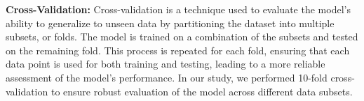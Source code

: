 \documentclass[conference]{IEEEtran}
\begin{document}
\vspace{.2em}
\textbf{Cross-Validation:}  
Cross-validation is a technique used to evaluate the model’s ability to generalize to unseen data by partitioning the dataset into multiple subsets, or folds. The model is trained on a combination of the subsets and tested on the remaining fold. This process is repeated for each fold, ensuring that each data point is used for both training and testing, leading to a more reliable assessment of the model's performance. In our study, we performed 10-fold cross-validation to ensure robust evaluation of the model across different data subsets.


\begin{table}[h]
\centering
\renewcommand{\arraystretch}{1.4}
\vspace{.6em}
\caption{10-Fold Cross-Validation Results}
\label{table:cross_val}
\end{table}
\vspace{-1.5em}
\end{document}
